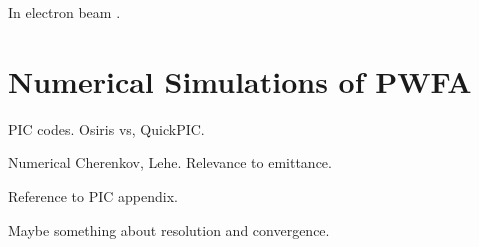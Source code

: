 
In electron beam \cite{muggli:2014}.

\section{Numerical Simulations of PWFA}
\label{Int:Sim}

PIC codes. Osiris vs, QuickPIC.

Numerical Cherenkov, Lehe. Relevance to emittance.

Reference to PIC appendix.

Maybe something about resolution and convergence.

